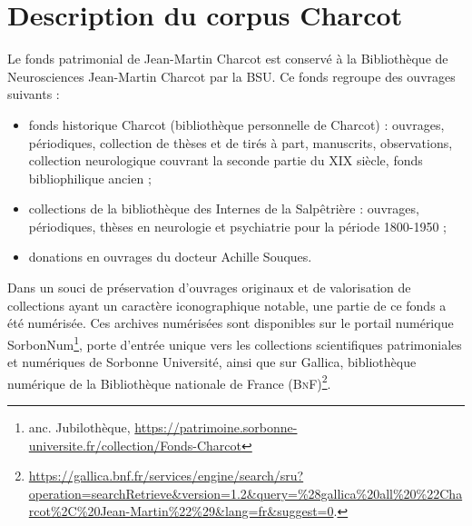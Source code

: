 \label{corpus}
\minitoc
\section{Description du corpus Charcot}
Le fonds patrimonial de Jean-Martin Charcot est conservé à la Bibliothèque de Neurosciences Jean-Martin Charcot par la BSU.
 Ce fonds regroupe des ouvrages suivants : 
\begin{itemize}
\item fonds historique Charcot (bibliothèque personnelle de Charcot) : ouvrages, périodiques, collection de thèses et de tirés à part, manuscrits, observations, collection neurologique couvrant la seconde partie du XIX\ieme{} siècle, fonds bibliophilique ancien ;
\item collections de la bibliothèque des Internes de la Salpêtrière : ouvrages, périodiques, thèses en neurologie et psychiatrie pour la période 1800-1950 ;
\item donations en ouvrages du docteur Achille Souques.
\end{itemize}
\medskip
Dans un souci de préservation d'ouvrages originaux et de valorisation de collections ayant un caractère iconographique notable, une partie de ce fonds a été numérisée. Ces archives numérisées sont disponibles sur le portail numérique
SorbonNum\footnote{anc. Jubilothèque, \url{https://patrimoine.sorbonne-universite.fr/collection/Fonds-Charcot}}, porte d'entrée unique vers les collections scientifiques patrimoniales et numériques de Sorbonne Université, ainsi que sur Gallica, bibliothèque numérique de la Bibliothèque nationale de France (\textsc{BnF})\footnote{\url{https://gallica.bnf.fr/services/engine/search/sru?operation=searchRetrieve&version=1.2&query=\%28gallica\%20all\%20\%22Charcot\%2C\%20Jean-Martin\%22\%29&lang=fr&suggest=0}.}.


